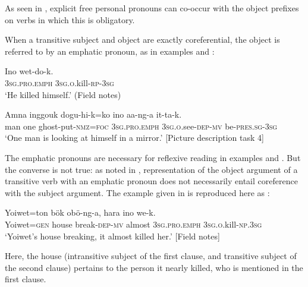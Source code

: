 \documentclass[output=paper,colorlinks,citecolor=brown]{langscibook}
\begin{document}
As seen in , explicit free personal pronouns can co-occur with the object prefixes on verbs in which this is obligatory.

When a transitive subject and object are exactly coreferential, the object is referred to by an emphatic pronoun, as in examples  and : 

\ea%
    \label{ex:sarvasy:12}
    \gll    Ino    wet-do-k.\\
            \textsc{3sg.pro.emph}  \textsc{3sg.o.}kill-\textsc{rp-3sg}\\
    \glt    ‘He killed himself.’ (Field notes)
\z

\ea%
    \label{ex:sarvasy:13}
    \gll    Amna   inggouk   dogu-hi-k=ko     ino aa-ng-a     it-ta-k.\\
            man  one    ghost-put\textsc{{}-nmz=foc}  \textsc{3sg.pro.emph} \textsc{3sg.o.}see-\textsc{dep-mv}  be-\textsc{pres.sg-3sg}\\
    \glt    ‘One man is looking at himself in a mirror.’ [Picture description task 4]
\z

The emphatic pronouns are necessary for reflexive reading in examples  and . But the converse is not true: as noted in \citet[355]{Sarvasy2017Grammar}, representation of the object argument of a transitive verb with an emphatic pronoun does not necessarily entail coreference with the subject argument. The example given in \citet[355]{Sarvasy2017Grammar} is reproduced here as :

\ea%
    \label{ex:sarvasy:14}
    \gll    Yoiwet=ton  bök   obö-ng-a,  hara  ino we-k.\\
            Yoiwet=\textsc{gen}   house   break-\textsc{dep-mv}   almost   \textsc{3sg.pro.emph} \textsc{3sg.o.}kill-\textsc{np.3sg}\\
    \glt    ‘Yoiwet’s house breaking, it almost killed her.’ [Field notes]
\z

Here, the house (intransitive subject of the first clause, and transitive subject of the second clause) pertains to the person it nearly killed, who is mentioned in the first clause.
\end{document}
